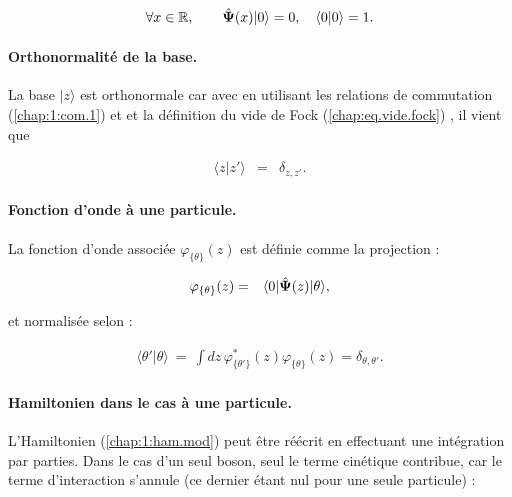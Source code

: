 \begin{eqnarray}
	\forall x \in \mathbb{R}, \qquad \hat{\bm{\Psi}}(x) \vert 0 \rangle = 0 ,\quad  \langle 0\vert 0 \rangle = 1. \label{chap:eq.vide.fock}
\end{eqnarray}

\paragraph{Orthonormalité de la base.}

La base $\vert z \rangle$ est orthonormale car avec en utilisant les relations de commutation (\ref{chap:1:com.1}) et et la définition du vide de Fock (\ref{chap:eq.vide.fock}) , il vient que 

\begin{eqnarray}
	\langle z\vert z' \rangle  & = & \delta_{z,z'}.
\end{eqnarray}


\paragraph{Fonction d’onde à une particule.}

La fonction d’onde associée \(\varphi_{\{\theta \}}(z)\) est définie comme la projection :

\begin{eqnarray}
	\varphi_{\{\theta\}}(z) & = & \langle 0 \vert \hat{\bm{\Psi}}(z) \vert \theta \rangle,
\end{eqnarray}

et normalisée selon :

\begin{eqnarray}
	\langle \theta' \vert \theta \rangle ~=~ \int dz\,  \varphi_{\{\theta'\}}^\ast(z)\varphi_{\{\theta\}}(z) = \delta_{\theta, \theta'}.
\end{eqnarray}

\paragraph{Hamiltonien dans le cas à une particule.}

L'Hamiltonien (\ref{chap:1:ham.mod}) peut être réécrit en effectuant une intégration par parties. Dans le cas d'un seul boson, seul le terme cinétique contribue, car le terme d'interaction s'annule (ce dernier étant nul pour une seule particule) :


